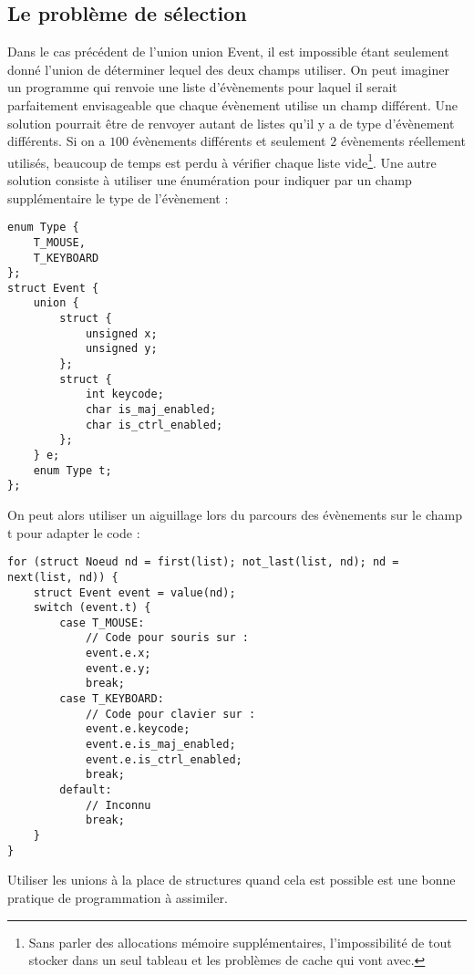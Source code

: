 \documentclass[../../../main.tex]{subfiles}
\begin{document}
\subsection{Le problème de sélection}
Dans le cas précédent de l'union \textsf{union Event}, il est impossible étant seulement donné l'union de déterminer lequel des deux champs utiliser. On peut imaginer un programme qui renvoie une liste d'évènements pour laquel il serait parfaitement envisageable que chaque évènement utilise un champ différent. Une solution pourrait être de renvoyer autant de listes qu'il y a de type d'évènement différents. Si on a $100$ évènements différents et seulement $2$ évènements réellement utilisés, beaucoup de temps est perdu à vérifier chaque liste vide\footnote{Sans parler des allocations mémoire supplémentaires, l'impossibilité de tout stocker dans un seul tableau et les problèmes de cache qui vont avec.}. Une autre solution consiste à utiliser une énumération pour indiquer par un champ supplémentaire le type de l'évènement :
\begin{verbatim}
enum Type {
	T_MOUSE,
	T_KEYBOARD
};
struct Event {
	union {
		struct {
			unsigned x;
			unsigned y;
		};
		struct {
			int keycode;
			char is_maj_enabled;
			char is_ctrl_enabled;
		};
	} e;
	enum Type t;
};
\end{verbatim}
On peut alors utiliser un aiguillage lors du parcours des évènements sur le champ \textsf{t} pour adapter le code :
\begin{verbatim}
for (struct Noeud nd = first(list); not_last(list, nd); nd = next(list, nd)) {
	struct Event event = value(nd);
	switch (event.t) {
		case T_MOUSE:
			// Code pour souris sur :
			event.e.x;
			event.e.y;
			break;
		case T_KEYBOARD:
			// Code pour clavier sur :
			event.e.keycode;
			event.e.is_maj_enabled;
			event.e.is_ctrl_enabled;
			break;
		default:
			// Inconnu
			break;
	}
}
\end{verbatim}
Utiliser les unions à la place de structures quand cela est possible est une bonne pratique de programmation
à assimiler.
\end{document}
